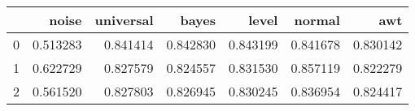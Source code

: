 \begin{tabular}{lrrrrrr}
\toprule
{} &     noise &  universal &     bayes &     level &    normal &       awt \\
\midrule
0 &  0.513283 &   0.841414 &  0.842830 &  0.843199 &  0.841678 &  0.830142 \\
1 &  0.622729 &   0.827579 &  0.824557 &  0.831530 &  0.857119 &  0.822279 \\
2 &  0.561520 &   0.827803 &  0.826945 &  0.830245 &  0.836954 &  0.824417 \\
\bottomrule
\end{tabular}
